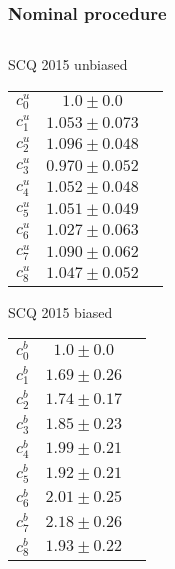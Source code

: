 \documentclass[aspectratio=43,9pt]{beamer}
\begin{document}
\begin{frame}[default] %
\frametitle{Nominal procedure}

\footnotesize

\begin{columns}[T]


  \begin{column}{0.25\textwidth}
    \begin{block}{SCQ 2015 unbiased} \centering
    \begin{tabular}{ccc}
      $c_0^u$ & $1.0   \pm 0.0  $ \\
      $c_1^u$ & $1.053 \pm 0.073$ \\
      $c_2^u$ & $1.096 \pm 0.048$ \\
      $c_3^u$ & $0.970 \pm 0.052$ \\
      $c_4^u$ & $1.052 \pm 0.048$ \\
      $c_5^u$ & $1.051 \pm 0.049$ \\
      $c_6^u$ & $1.027 \pm 0.063$ \\
      $c_7^u$ & $1.090 \pm 0.062$ \\
      $c_8^u$ & $1.047 \pm 0.052$ \\
    \end{tabular}
    \end{block}
    \begin{block}{SCQ 2015 biased} \centering
    \begin{tabular}{ccc}
      $c_0^b$ & $1.0   \pm 0.0  $ \\
      $c_1^b$ & $1.69 \pm 0.26$ \\
      $c_2^b$ & $1.74 \pm 0.17$ \\
      $c_3^b$ & $1.85 \pm 0.23$ \\
      $c_4^b$ & $1.99 \pm 0.21$ \\
      $c_5^b$ & $1.92 \pm 0.21$ \\
      $c_6^b$ & $2.01 \pm 0.25$ \\
      $c_7^b$ & $2.18 \pm 0.26$ \\
      $c_8^b$ & $1.93 \pm 0.22$ \\
    \end{tabular}
    \end{block}
  \end{column}


\end{columns}
\end{frame}
\end{document}
